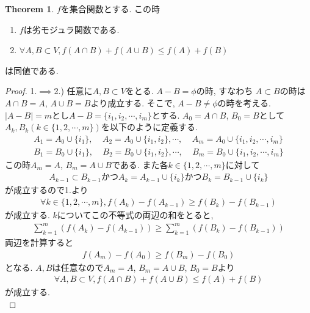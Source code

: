 \documentclass[11pt, a4paper, dvipdfmx]{jsarticle}
\theoremstyle{definition}
\newtheorem{Theorem+}[Axiom+]{Theorem}
\begin{document}
\begin{Theorem+}$f$を集合関数とする. この時
    \begin{enumerate}
        \item $f$は劣モジュラ関数である.
        \item $\forall A, B\subset V, f(A\cap B) + f(A\cup B)\leq f(A) + f(B)$ 
    \end{enumerate}
    は同値である.
    \begin{proof}
        1.$\implies$2.) 任意に$A, B\subset V$をとる. $A - B = \phi$の時, すなわち
        $A\subset B$の時は$A\cap B = A$, $A\cup B = B$より成立する. そこで, $A - B\neq\phi$の時を考える.
        $| A - B| = m$とし$A - B = \{i_{1}, i_{2}, \cdots, i_{m}\}$とする. $A_{0} = A\cap B$, $B_{0} = B$として
        $A_{k}, B_{k} (k\in\{1, 2, \cdots, m\})$を以下のように定義する.
        \begin{align*}
            A_{1} = A_{0}\cup\{i_{1}\}, ~~~~~ A_{2} = A_{0}\cup\{i_{1}, i_{2}\}, \cdots, ~~~~~ A_{m} = A_{0}\cup\{i_{1}, i_{2}, \cdots, i_{m}\}\\
            B_{1} = B_{0}\cup\{i_{1}\}, ~~~~~ B_{2} = B_{0}\cup\{i_{1}, i_{2}\}, \cdots, ~~~~~ B_{m} = B_{0}\cup\{i_{1}, i_{2}, \cdots, i_{m}\}
        \end{align*}
        この時$A_{m} = A$, $B_{m} = A\cup B$である. また各$k\in\{1, 2, \cdots, m\}$に対して
        \begin{align*}
             A_{k - 1}\subset B_{k-1}かつA_{k} = A_{k-1}\cup\{i_{k}\}かつB_{k} = B_{k-1}\cup\{i_{k}\}
        \end{align*}
        が成立するので1.より
        \begin{align*}
            \forall k\in\{1, 2, \cdots, m\}, f(A_{k}) - f(A_{k - 1})\geq f(B_{k}) - f(B_{k-1})
        \end{align*}
        が成立する. $k$についてこの不等式の両辺の和をとると, 
        \begin{align*}
            \sum_{k =1}^{m}\left(f(A_{k}) - f(A_{k - 1})\right)\geq\sum_{k =1}^{m}\left(f(B_{k}) - f(B_{k - 1})\right)
        \end{align*}
        両辺を計算すると
        \begin{align*}
            f(A_{m}) - f(A_{0})\geq f(B_{m}) - f(B_{0})
        \end{align*}
        となる. $A, B$は任意なので$A_{m} = A$, $B_{m} = A\cup B$, $B_{0} = B$より
        \begin{align*}
            \forall A, B\subset V, f(A\cap B) + f(A\cup B)\leq f(A) + f(B)
        \end{align*}
        が成立する.\\


\end{proof}
\end{Theorem+}
\end{document}
